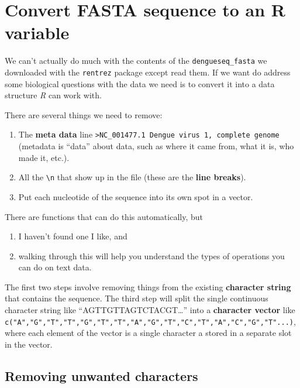\documentclass[
]{book}
\providecommand{\tightlist}{%
  \setlength{\itemsep}{0pt}\setlength{\parskip}{0pt}}
\begin{document}
\hypertarget{convert-fasta-sequence-to-an-r-variable}{%
\section{Convert FASTA sequence to an R variable}\label{convert-fasta-sequence-to-an-r-variable}}

We can't actually do much with the contents of the \texttt{dengueseq\_fasta} we downloaded with the \texttt{rentrez} package except read them. If we want do address some biological questions with the data we need is to convert it into a data structure \emph{R} can work with.

There are several things we need to remove:

\begin{enumerate}
\def\labelenumi{\arabic{enumi}.}
\tightlist
\item
  The \textbf{meta data} line \texttt{\textgreater{}NC\_001477.1\ Dengue\ virus\ 1,\ complete\ genome} (metadata is ``data'' about data, such as where it came from, what it is, who made it, etc.).
\item
  All the \texttt{\textbackslash{}n} that show up in the file (these are the \textbf{line breaks}).
\item
  Put each nucleotide of the sequence into its own spot in a vector.
\end{enumerate}

There are functions that can do this automatically, but

\begin{enumerate}
\def\labelenumi{\arabic{enumi}.}
\tightlist
\item
  I haven't found one I like, and
\item
  walking through this will help you understand the types of operations you can do on text data.
\end{enumerate}

The first two steps involve removing things from the existing \textbf{character string} that contains the sequence. The third step will split the single continuous character string like ``AGTTGTTAGTCTACGT\ldots{}'' into a \textbf{character vector} like \texttt{c("A","G","T","T","G","T","T","A","G","T","C","T","A","C","G","T"...)}, where each element of the vector is a single character a stored in a separate slot in the vector.

\hypertarget{removing-unwanted-characters}{%
\subsection{Removing unwanted characters}\label{removing-unwanted-characters}}
\end{document}
